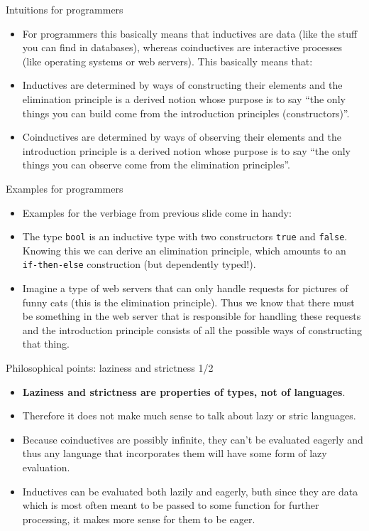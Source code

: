 \documentclass{beamer}
\begin{document}
\begin{frame}{Intuitions for programmers}
\begin{itemize}
	\item For programmers this basically means that inductives are data (like the stuff you can find in databases), whereas coinductives are interactive processes (like operating systems or web servers). This basically means that:
	\item Inductives are determined by ways of constructing their elements and the elimination principle is a derived notion whose purpose is to say ``the only things you can build come from the introduction principles (constructors)''.
	\item Coinductives are determined by ways of observing their elements and the introduction principle is a derived notion whose purpose is to say ``the only things you can observe come from the elimination principles''.
\end{itemize}
\end{frame}

\begin{frame}{Examples for programmers}
\begin{itemize}
	\item Examples for the verbiage from previous slide come in handy:
	\item The type \texttt{bool} is an inductive type with two constructors \texttt{true} and \texttt{false}. Knowing this we can derive an elimination principle, which amounts to an \texttt{if-then-else} construction (but dependently typed!).
	\item Imagine a type of web servers that can only handle requests for pictures of funny cats (this is the elimination principle). Thus we know that there must be something in the web server that is responsible for handling these requests and the introduction principle consists of all the possible ways of constructing that thing.
\end{itemize}
\end{frame}

\begin{frame}{Philosophical points: laziness and strictness 1/2}
\begin{itemize}
	\item \textbf{Laziness and strictness are properties of types, not of languages}.
	\item Therefore it does not make much sense to talk about lazy or stric languages.
	\item Because coinductives are possibly infinite, they can't be evaluated eagerly and thus any language that incorporates them will have some form of lazy evaluation.
	\item Inductives can be evaluated both lazily and eagerly, buth since they are data which is most often meant to be passed to some function for further processing, it makes more sense for them to be eager.
\end{itemize}
\end{frame}
\end{document}
